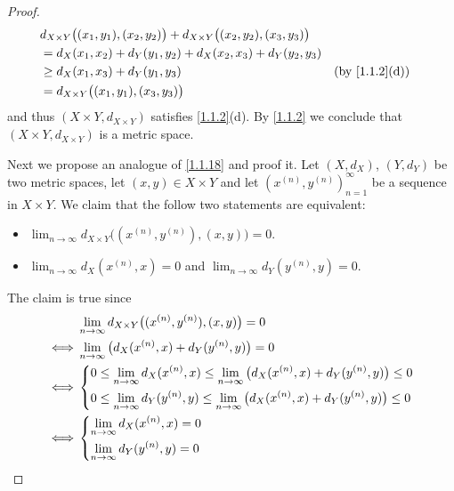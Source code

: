 \begin{proof}
  \begin{align*}
     & d_{X \times Y}\big((x_1, y_1), (x_2, y_2)\big) + d_{X \times Y}\big((x_2, y_2), (x_3, y_3)\big)                                  \\
     & = d_X(x_1, x_2) + d_Y(y_1, y_2) + d_X(x_2, x_3) + d_Y(y_2, y_3)                                                                  \\
     & \geq d_X(x_1, x_3) + d_Y(y_1, y_3)                                                              &  & \text{(by \cref{1.1.2}(d))} \\
     & = d_{X \times Y}\big((x_1, y_1), (x_3, y_3)\big)
  \end{align*}
  and thus \((X \times Y, d_{X \times Y})\) satisfies \cref{1.1.2}(d).
  By \cref{1.1.2} we conclude that \((X \times Y, d_{X \times Y})\) is a metric space.

  Next we propose an analogue of \cref{1.1.18} and proof it.
  Let \((X, d_X)\), \((Y, d_Y)\) be two metric spaces, let \((x, y) \in X \times Y\) and let \((x^{(n)}, y^{(n)})_{n = 1}^\infty\) be a sequence in \(X \times Y\).
  We claim that the follow two statements are equivalent:
  \begin{itemize}
    \item \(\lim_{n \to \infty} d_{X \times Y}\big((x^{(n)}, y^{(n)}), (x, y)\big) = 0\).
    \item \(\lim_{n \to \infty} d_X(x^{(n)}, x) = 0\) and \(\lim_{n \to \infty} d_Y(y^{(n)}, y) = 0\).
  \end{itemize}
  The claim is true since
  \begin{align*}
         & \lim_{n \to \infty} d_{X \times Y}\big((x^{(n)}, y^{(n)}), (x, y)\big) = 0                                             \\
    \iff & \lim_{n \to \infty} \big(d_X(x^{(n)}, x) + d_Y(y^{(n)}, y)\big) = 0                                                    \\
    \iff & \begin{dcases}
             0 \leq \lim_{n \to \infty} d_X(x^{(n)}, x) \leq \lim_{n \to \infty} \big(d_X(x^{(n)}, x) + d_Y(y^{(n)}, y)\big) \leq 0 \\
             0 \leq \lim_{n \to \infty} d_Y(y^{(n)}, y) \leq \lim_{n \to \infty} \big(d_X(x^{(n)}, x) + d_Y(y^{(n)}, y)\big) \leq 0
           \end{dcases} \\
    \iff & \begin{dcases}
             \lim_{n \to \infty} d_X(x^{(n)}, x) = 0 \\
             \lim_{n \to \infty} d_Y(y^{(n)}, y) = 0
           \end{dcases}
  \end{align*}


\end{proof}
